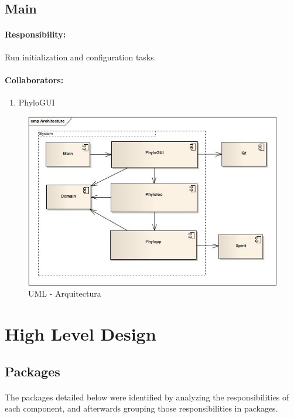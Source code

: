 \documentclass[a4paper,10pt]{article}
\begin{document}
\subsection{Main}

\paragraph{Responsibility:} Run initialization and configuration tasks.
\paragraph{Collaborators:}
      \begin{enumerate}
	   \item PhyloGUI
      \end{enumerate}
	  

  \begin{figure}
  \centering
  \includegraphics[scale=0.5]{images/Architecture.jpg}  
  \caption{UML - Arquitectura}
  \label{uml:architecture}
  \end{figure}

\section{High Level Design}
\label{hld}

\subsection{Packages}

\paragraph{}
The packages detailed below were identified by analyzing the responsibilities of each component, and afterwards grouping those responsibilities in packages.
\end{document}
